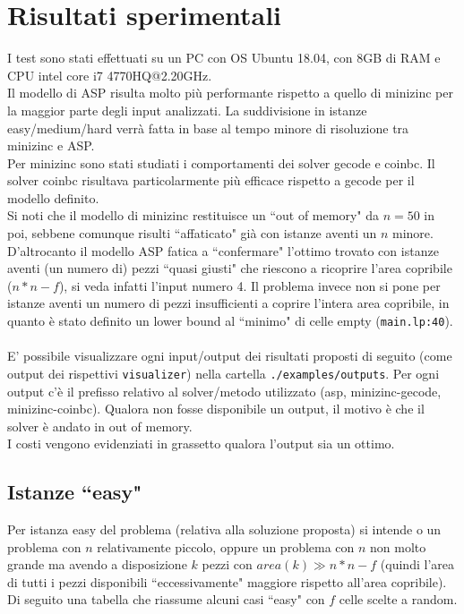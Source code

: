 \documentclass{article}
\begin{document}
\section{Risultati sperimentali}
I test sono stati effettuati su un PC con OS Ubuntu 18.04, con 8GB di RAM e CPU intel core i7 4770HQ@2.20GHz.\\
Il modello di ASP risulta molto più performante rispetto a quello di minizinc per la maggior parte degli input analizzati. La suddivisione in istanze easy/medium/hard verrà fatta in base al tempo minore di risoluzione tra minizinc e ASP.\\
Per minizinc sono stati studiati i comportamenti dei solver gecode e coinbc. Il solver coinbc risultava particolarmente più efficace rispetto a gecode per il modello definito. \\Si noti che il modello di minizinc restituisce un ``out of memory" da $n=50$ in poi, sebbene comunque risulti ``affaticato" già con istanze aventi un $n$ minore.\\
D'altrocanto il modello ASP fatica a ``confermare" l'ottimo trovato con istanze aventi (un numero di) pezzi ``quasi giusti" che riescono a ricoprire l'area copribile ($n*n - f$), si veda infatti l'input numero 4. Il problema invece non si pone per istanze aventi un numero di pezzi insufficienti a coprire l'intera area copribile, in quanto è stato definito un lower bound al ``minimo" di celle empty (\texttt{main.lp:40}).\\\\
E' possibile visualizzare ogni input/output dei risultati proposti di seguito (come output dei rispettivi \texttt{visualizer}) nella cartella \texttt{./examples/outputs}. Per ogni output c'è il prefisso relativo al solver/metodo utilizzato (asp, minizinc-gecode, minizinc-coinbc). Qualora non fosse disponibile un output, il motivo è che il solver è andato in out of memory.\\I costi vengono evidenziati in grassetto qualora l'output sia un ottimo.

\subsection{Istanze ``easy"}
Per istanza easy del problema (relativa alla soluzione proposta) si intende o un problema con $n$ relativamente piccolo, oppure un problema con $n$ non molto grande ma avendo a disposizione $k$ pezzi con $area(k) \gg n*n-f$ (quindi l'area di tutti i pezzi disponibili ``eccessivamente" maggiore rispetto all'area copribile). Di seguito una tabella che riassume alcuni casi ``easy" con $f$ celle scelte a random.\\
\end{document}
